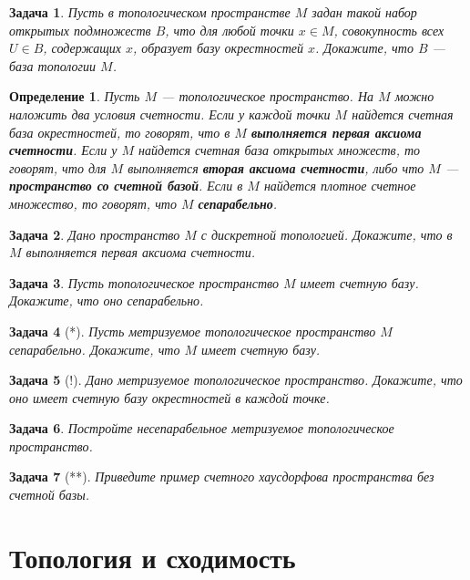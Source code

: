 \documentclass[12pt]{book}
\theoremstyle{upshape}
\newtheorem{zadacha}{Задача}[chapter]
\theoremstyle{generic}
\newtheorem{opredelenie}[teorema]{Определение}
\theoremstyle{upshapenonumber}
\newcommand{\следствие}{%
     \refstepcounter{teorema}
     {\noindent\bf Следствие \thechapter.\arabic{teorema}:\ }}
\newcommand{\пример}{%
     \refstepcounter{teorema}
     {\noindent\bf Пример \thechapter.\arabic{teorema}:\ }}
\newcommand{\лемма}{%
     \refstepcounter{teorema}
     {\noindent\bf Лемма \thechapter.\arabic{teorema}:\ }}
\newcommand{\теорема}{%
     \refstepcounter{teorema}
     {\noindent\bf Теорема \thechapter.\arabic{teorema}:\ }}
\newcommand{\утверждение}{%
     \refstepcounter{teorema}
     {\noindent\bf Утверждение \thechapter.\arabic{teorema}:\ }}
\begin{document}
{\begin{zadacha}
Пусть в топологическом пространстве $M$ задан такой набор открытых
подмножеств $B$, что для любой точки $x\in M$, совокупность всех
$U\in B$, содержащих $x$, образует базу окрестностей $x$.  
Докажите, что $B$ --- база топологии $M$.
\end{zadacha}

\begin{opredelenie}
Пусть $M$ --- топологическое пространство. На $M$ можно наложить два
условия счетности. Если у каждой точки $M$ найдется счетная база
окрестностей, то говорят, что в $M$ {\bf выполняется первая аксиома
счетности}. Если у $M$ найдется счетная база открытых множеств, то
говорят, что для $M$ выполняется {\bf вторая аксиома счетности},
либо что $M$ --- {\bf пространство со счетной базой}. Если в $M$
найдется плотное счетное множество, то говорят, что $M$ {\bf
сепарабельно}.
\end{opredelenie}

\begin{zadacha}
Дано пространство $M$ с дискретной топологией.  Докажите, что в $M$
выполняется первая аксиома счетности.
\end{zadacha}

\begin{zadacha} 
Пусть топологическое пространство $M$ имеет счетную базу.  Докажите,
что оно сепарабельно.
\end{zadacha}

\begin{zadacha}[*]
Пусть метризуемое топологическое пространство $M$ 
сепарабельно. Докажите, что $M$ имеет
счетную базу. 
\end{zadacha}

\begin{zadacha}[!]
Дано метризуемое топологическое пространство.  Докажите, что оно
имеет счетную базу окрестностей в каждой точке.
\end{zadacha}

\begin{zadacha} 
Постройте несепарабельное метризуемое топологическое пространство.
\end{zadacha}

\begin{zadacha}[**]
Приведите пример счетного хаусдорфова пространства без счетной базы.
\end{zadacha}

\section{Топология и сходимость}

}
\end{document}
